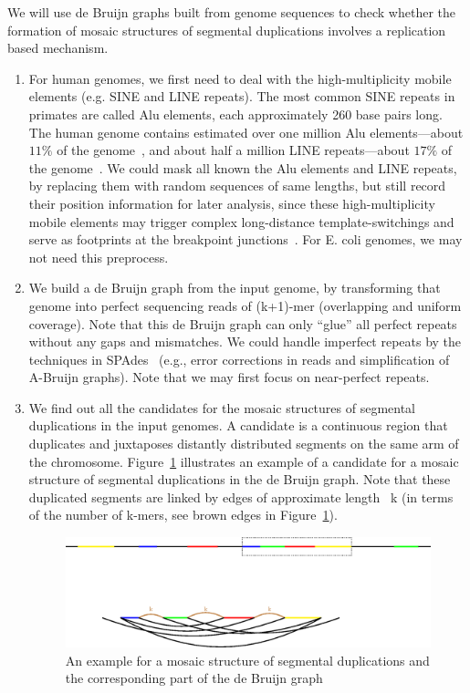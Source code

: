 \documentclass[12pt]{article}
\begin{document}
We will use de Bruijn graphs built from genome sequences to check whether the formation of mosaic structures of segmental duplications involves a replication based mechanism. 
\begin{enumerate}
\item For human genomes, we first need to deal with the high-multiplicity mobile elements (e.g. SINE and LINE repeats). 
 The most common SINE repeats in primates are called Alu elements, each approximately 260 base pairs long. 
 The human genome contains estimated over one million Alu elements---about $11\%$ of the genome~\cite{lander2001}, 
 and about half a million LINE repeats---about $17\%$ of the genome~\cite{cordaux2009}. 
 We could mask all known the Alu elements and LINE repeats, by replacing them with random sequences of same lengths, 
 but still record their position information for later analysis, 
 since these high-multiplicity mobile elements may trigger complex long-distance template-switchings 
 and serve as footprints at the breakpoint junctions~\cite{carvalho2011inverted}. For E. coli genomes, we may not need this preprocess.
 \item We build a de Bruijn graph from the input genome, by transforming that genome into perfect sequencing reads of (k+1)-mer (overlapping and uniform coverage).
 Note that this de Bruijn graph can only ``glue'' all perfect repeats without any gaps and mismatches. 
 We could handle imperfect repeats by the techniques in SPAdes~\cite{spades} (e.g., error corrections in reads and simplification of A-Bruijn graphs). 
 Note that we may first focus on near-perfect repeats.
 \item We find out all the candidates for the mosaic structures of segmental duplications in the input genomes. 
 A candidate is a continuous region that duplicates and juxtaposes distantly distributed segments on the same arm of the chromosome.
 Figure~\ref{candidate} illustrates an example of a candidate for a mosaic structure of segmental duplications in the de Bruijn graph. 
 Note that these duplicated segments are linked by edges of approximate length ~k (in terms of the number of k-mers, see brown edges in Figure~\ref{candidate}).
\begin{figure}[H]
\begin{center}
\includegraphics[width=1.0\textwidth]{mosaic.eps}
\caption{An example for a mosaic structure of segmental duplications and the corresponding part of the de Bruijn graph}
\label{candidate}
\end{center}
\end{figure}


\end{enumerate}
\end{document}
